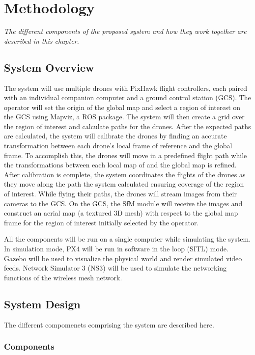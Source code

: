 \setlength{\footskip}{8mm}

\chapter{Methodology}
\label{ch:methodology}

\textit{The different components of the proposed system and how they work together are described in this chapter.}

\section{System Overview}
The system will use multiple drones with PixHawk flight controllers, each paired with an individual companion computer and a ground control station (GCS). The operator will set the origin of the global map and select a region of interest on the GCS using Mapviz, a ROS package. The system will then create a grid over the region of interest and calculate paths for the drones. After the expected paths are calculated, the system will calibrate the drones by finding an accurate transformation between each drone's local frame of reference and the global frame. To accomplish this, the drones will move in a predefined flight path while the transformations between each local map of and the global map is refined. After calibration is complete, the system coordinates the flights of the drones as they move along the path the system calculated ensuring coverage of the region of interest. While flying their paths, the drones will stream images from their cameras to the GCS. On the GCS, the SfM module will receive the images and construct an aerial map (a textured 3D mesh) with respect to the global map frame for the region of interest initially selected by the operator.

All the components will be run on a single computer while simulating the system. In simulation mode, PX4 will be run in software in the loop (SITL) mode. Gazebo will be used to visualize the physical world and render simulated video feeds. Network Simulator 3 (NS3) will be used to simulate the networking functions of the wireless mesh network.

\section{System Design}

The different compomenets comprising the system are described here.

\subsection{Components}

